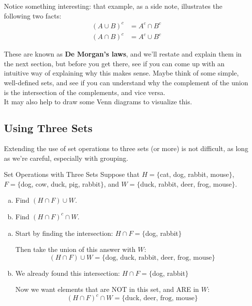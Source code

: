 Notice something interesting: that example, as a side note, illustrates the following two facts:
\begin{align*}
(A \cup B)^c &= A^c \cap B^c\\
(A \cap B)^c &= A^c \cup B^c
\end{align*}

These are known as \textbf{De Morgan's laws}, and we'll restate and explain them in the next section, but before you get there, see if you can come up with an intuitive way of explaining why this makes sense.  Maybe think of some simple, well-defined sets, and see if you can understand why the complement of the union is the intersection of the complements, and vice versa.\\

It may also help to draw some Venn diagrams to visualize this.

\subsection{Using Three Sets}

Extending the use of set operations to three sets (or more) is not difficult, as long as we're careful, especially with grouping.

\begin{example}{Set Operations with Three Sets}
Suppose that $H=\{$cat, dog, rabbit, mouse$\}$, $F=\{$dog, cow, duck, pig, rabbit$\}$, and $W=\{$duck, rabbit, deer, frog, mouse$\}$.
\begin{enumerate}[(a)]
\item Find $(H \cap F) \cup W$.
\item Find $(H \cap F)^c \cap W$.
\end{enumerate}

\sol
\begin{enumerate}[(a)]
\item Start by finding the intersection: $H \cap F = \{$dog, rabbit$\}$

Then take the union of this answer with $W$:
\[\boxed{(H \cap F) \cup W = \{\textrm{dog, duck, rabbit, deer, frog, mouse}\}}\]

\item We already found this intersection: $H \cap F = \{$dog, rabbit$\}$

Now we want elements that are NOT in this set, and ARE in $W$:
\[\boxed{(H \cap F)^c \cap W = \{\textrm{duck, deer, frog, mouse}\}}\]
\end{enumerate}
\end{example}

